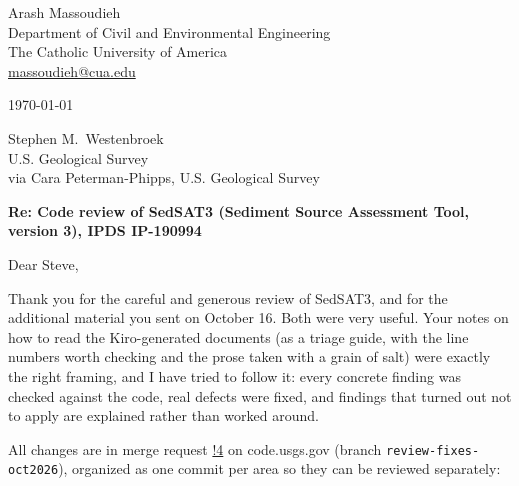 \documentclass[11pt]{article}
\newcommand{\code}[1]{\texttt{#1}}
\begin{document}
\sloppy
\setlength{\emergencystretch}{3em}

\begin{flushleft}
Arash Massoudieh\\
Department of Civil and Environmental Engineering\\
The Catholic University of America\\
\href{mailto:massoudieh@cua.edu}{massoudieh@cua.edu}

\medskip
\today

\medskip
Stephen M.\ Westenbroek\\
U.S. Geological Survey\\
via Cara Peterman-Phipps, U.S. Geological Survey
\end{flushleft}

\textbf{Re: Code review of SedSAT3 (Sediment Source Assessment Tool, version 3), IPDS IP-190994}

Dear Steve,

Thank you for the careful and generous review of SedSAT3, and for the
additional material you sent on October 16. Both were very useful. Your
notes on how to read the Kiro-generated documents (as a triage guide, with
the line numbers worth checking and the prose taken with a grain of salt)
were exactly the right framing, and I have tried to follow it: every
concrete finding was checked against the code, real defects were fixed, and
findings that turned out not to apply are explained rather than worked
around.

All changes are in merge request
\href{https://code.usgs.gov/cphipps/SedimentSourceAssessmentTool3/-/merge_requests/4}{!4}
on code.usgs.gov (branch \code{review-fixes-oct2026}), organized as one commit
per area so they can be reviewed separately:
\end{document}
